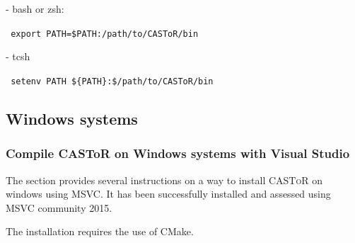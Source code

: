 \documentclass[a4paper, 11pt]{article}
\newcommand{\castor}{\textsc{CASToR}\xspace}
\begin{document}
\begin{enumerate}
- bash or zsh:

\verb| export PATH=$PATH:/path/to/CASToR/bin|

- tcsh

\verb| setenv PATH ${PATH}:$/path/to/CASToR/bin|
\end{enumerate}

\subsection{Windows systems}
\label{ss_install_win}


\subsubsection{Compile CASToR on Windows systems with Visual Studio}
\label{sss_install_win_cmake}

The section provides several instructions on a way to install \castor on windows using MSVC. It has been successfully installed and assessed using MSVC community 2015.

The installation requires the use of CMake. 
\end{document}
